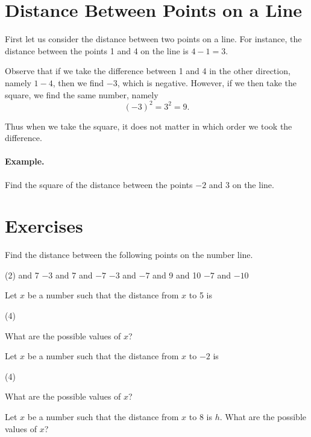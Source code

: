 \documentclass[12pt]{book} %
\begin{document}
\section{Distance Between Points on a Line}

First let us consider the distance between two points on a line. For instance, the distance between the points 1 and 4 on the line is $4-1=3$.

Observe that if we take the difference between 1 and 4 in the other direction, namely $1-4$, then we find $-3$, which is negative. However, if we then take the square, we find the same number, namely
\[
(-3)^2=3^2=9.
\]

Thus when we take the square, it does not matter in which order we took the difference.

\paragraph{Example.}
Find the square of the distance between the points $-2$ and 3 on the line.

\begin{center}
\end{center}


\section*{Exercises}

\begin{ExerciseList}
\Exercise Find the distance between the following points on the number line.
\begin{tasks}(2)
 and 7
\task[(2)] $-3$ and 7
 and $-7$
\task[(4)] $-3$ and $-7$
 and 9
 and 10
\task[(7)] $-7$ and $-10$
\end{tasks}

\Exercise Let $x$ be a number such that the distance from $x$ to 5 is
\begin{tasks}(4)
\end{tasks}
What are the possible values of $x$?

\Exercise Let $x$ be a number such that the distance from $x$ to $-2$ is
\begin{tasks}(4)
\end{tasks}
What are the possible values of $x$?

\Exercise Let $x$ be a number such that the distance from $x$ to 8 is $h$. What are the possible values of $x$?
\end{ExerciseList}
\end{document}
